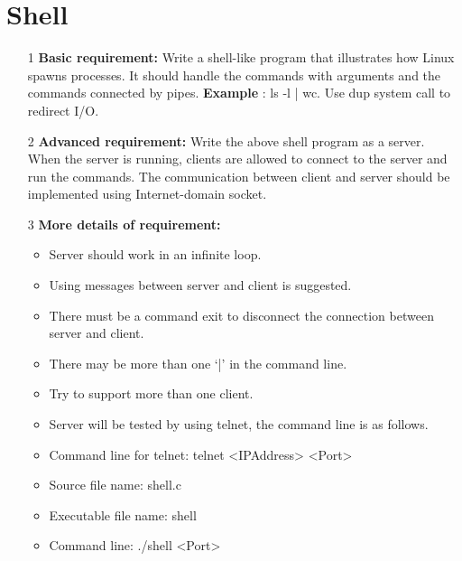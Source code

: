 \documentclass[]{article}
\begin{document}
\section{Shell}
\begin{enumerate}
    \item [1] \textbf{Basic requirement:} Write a shell-like program that illustrates how Linux spawns processes. It
    should handle the commands with arguments and the commands connected by pipes. \textbf{Example} :
    ls -l | wc. Use dup system call to redirect I/O.
    
    \item [2] \textbf{Advanced requirement:}  Write the above shell program as a server. When the server is
    running, clients are allowed to connect to the server and run the commands. The communication
    between client and server should be implemented using Internet-domain socket.
    
    \item[3] \textbf{More details of requirement:} 
    \begin{itemize}
        \item Server should work in an infinite loop.
        \item Using messages between server and client is suggested.
        \item There must be a command exit to disconnect the connection between server and client.
        \item There may be more than one ‘|’ in the command line.
        \item Try to support more than one client.
        \item Server will be tested by using telnet, the command line is as follows.
        \item Command line for telnet: telnet <IPAddress> <Port>
        \item Source file name: shell.c
        \item Executable file name: shell
        \item Command line: ./shell <Port>
    \end{itemize}
\end{enumerate}
\end{document}
